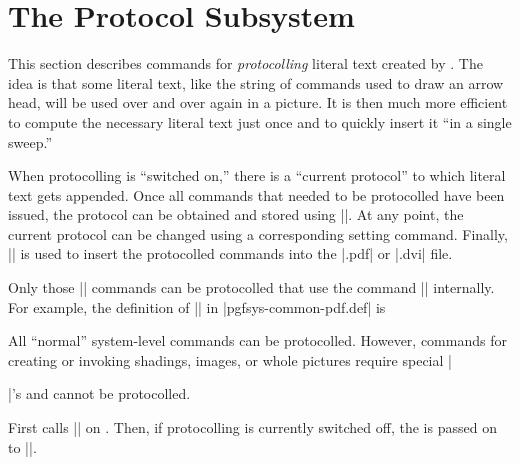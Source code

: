 %
%
%

\section{The Protocol Subsystem}

\label{section-protocols}

\makeatletter

This section describes commands for \emph{protocolling} literal text
created by \pgfname. The idea is that some literal text, like the string
of commands used to draw an arrow head, will be used over and over
again in a picture. It is then much more efficient to compute the
necessary literal text just once and to quickly insert it ``in a
single sweep.''

When protocolling is ``switched on,'' there is a ``current protocol''
to which literal text gets appended. Once all commands that needed to
be protocolled have been issued, the protocol can be obtained and
stored using |\pgfsysprotocol@getcurrentprotocol|. At any point, the
current protocol can be changed using a corresponding setting
command. Finally, |\pgfsysprotocol@invokecurrentprotocol| is used to
insert the protocolled commands into the |.pdf| or |.dvi| file.

Only those |\pgfsys@| commands can be protocolled that use the
command |\pgfsysprotocol@literal| internally. For example, the
definition of |\pgfsys@moveto| in |pgfsys-common-pdf.def| is
\begin{codeexample}
\def\pgfsys@moveto#1#2{\pgfsysprotocol@literal{#1 #2 m}}
\end{codeexample}
All ``normal'' system-level commands can be protocolled. However,
commands for creating or invoking shadings, images, or whole pictures
require special |\special|'s and cannot be protocolled.


\begin{command}{\pgfsysprotocol@literal{}}
  First calls |\pgfsysprotocol@literalbuffered| on . Then, if protocolling is currently switched off, the
   is passed on to |\pgfsys@invoke|.
\end{command}

